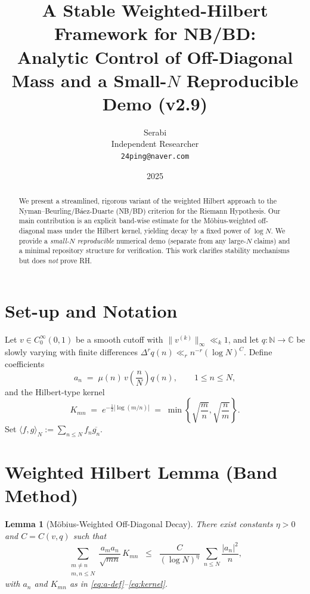 \documentclass[11pt]{article}
\title{A Stable Weighted-Hilbert Framework for NB/BD:\\
Analytic Control of Off-Diagonal Mass and a Small-$N$ Reproducible Demo (v2.9)}
\author{Serabi \\ Independent Researcher \\ \texttt{24ping@naver.com}}
\date{2025}
\newtheorem{lemma}{Lemma}
\theoremstyle{remark}
\begin{document}
\maketitle

\begin{abstract}
We present a streamlined, rigorous variant of the weighted Hilbert approach to the Nyman--Beurling/B\'aez-Duarte (NB/BD) criterion for the Riemann Hypothesis.
Our main contribution is an explicit band-wise estimate for the M\"obius-weighted off-diagonal mass under the Hilbert kernel, yielding decay by a fixed power of $\log N$.
We provide a \emph{small-$N$ reproducible} numerical demo (separate from any large-$N$ claims) and a minimal repository structure for verification.
This work clarifies stability mechanisms but does \emph{not} prove RH.
\end{abstract}

\section{Set-up and Notation}
Let $v\in C_0^\infty(0,1)$ be a smooth cutoff with $\|v^{(k)}\|_\infty\ll_k 1$, and let $q:\mathbb{N}\to\mathbb{C}$ be slowly varying with finite differences $\Delta^r q(n)\ll_r n^{-r}(\log N)^C$.
Define coefficients
\begin{equation}\label{eq:a-def}
a_n \;=\; \mu(n)\,v\!\left(\frac{n}{N}\right) q(n),\qquad 1\le n\le N,
\end{equation}
and the Hilbert-type kernel
\begin{equation}\label{eq:kernel}
K_{mn}\;=\;e^{-\frac12|\log(m/n)|}\;=\;\min\!\left\{\sqrt{\frac{m}{n}},\sqrt{\frac{n}{m}}\right\}.
\end{equation}
Set $\langle f,g\rangle_N:=\sum_{n\le N} f_n \overline{g_n}$.

\section{Weighted Hilbert Lemma (Band Method)}
\begin{lemma}[M\"obius-Weighted Off-Diagonal Decay]\label{lem:hilbert}
There exist constants $\eta>0$ and $C=C(v,q)$ such that
\begin{equation}\label{eq:main}
\sum_{\substack{m\ne n\\ m,n\le N}} \frac{a_m a_n}{\sqrt{mn}}\,K_{mn}
\;\;\le\;\; \frac{C}{(\log N)^{\eta}}\;\sum_{n\le N}\frac{|a_n|^2}{n},
\end{equation}
with $a_n$ and $K_{mn}$ as in \eqref{eq:a-def}--\eqref{eq:kernel}.
\end{lemma}
\end{document}
